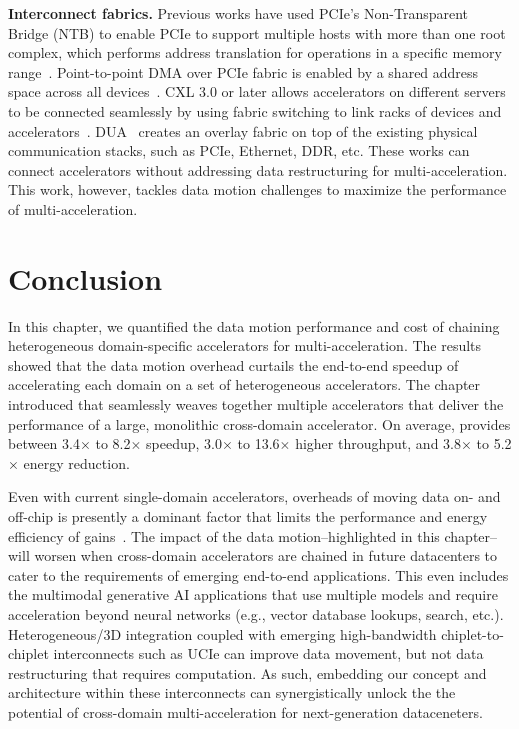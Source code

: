 \noindent \textbf{Interconnect fabrics.}
%
Previous works have used PCIe's Non-Transparent Bridge (NTB) to enable PCIe to support multiple hosts with more than one root complex, which performs address translation for operations in a specific memory range~\cite{hou:hpca:2013,smartio:tocs:2021}.
%
Point-to-point DMA over PCIe fabric is enabled by a shared address space across all devices~\cite{gigaio-pcie-swtich}.
%
CXL 3.0 or later allows accelerators on different servers to be connected seamlessly by using fabric switching to link racks of devices and accelerators~\cite{cxl-3-0-spec}.    
%
DUA~\cite{dua:nsdi:2019} creates an overlay fabric on top of the existing physical communication stacks, such as PCIe, Ethernet, DDR, etc.
%
These works can connect accelerators without addressing data restructuring for multi-acceleration.
%
This work, however, tackles data motion challenges to maximize the performance of multi-acceleration.

\section{Conclusion}
\label{sec:conclusion}
%
In this chapter, we quantified the data motion performance and cost of chaining heterogeneous domain-specific accelerators for multi-acceleration.
%
The results showed that the data motion overhead curtails the end-to-end speedup of accelerating each domain on a set of heterogeneous accelerators. 
%
The chapter introduced \dmx that seamlessly weaves together multiple accelerators that deliver the performance of a large, monolithic cross-domain accelerator. 
%
On average, \dmx provides between 3.4$\times$ to 8.2$\times$ speedup, 3.0$\times$ to 13.6$\times$ higher throughput, and 3.8$\times$ to 5.2$\times$ energy reduction.

Even with current single-domain accelerators, overheads of moving data on- and off-chip is presently a dominant factor that limits the performance and energy efficiency of gains~\cite{horowitz:isscc:2014, accelerator-cluster:hoti:2023}. 
%
The impact of the data motion--highlighted in this chapter--will worsen when cross-domain accelerators are chained in future datacenters to cater to the requirements of emerging end-to-end applications.
%
This even includes the multimodal generative AI applications that use multiple models and require acceleration beyond neural networks (e.g., vector database lookups, search, etc.).
%
Heterogeneous/3D integration coupled with emerging high-bandwidth chiplet-to-chiplet interconnects such as UCIe can improve data movement, but not data restructuring that requires computation.
%
As such, embedding our \dmx concept and architecture within these interconnects can synergistically unlock the the potential of cross-domain multi-acceleration for next-generation dataceneters.

